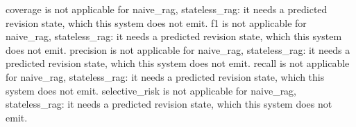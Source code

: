 \begin{table}
\footnotesize{coverage is not applicable for naive\_rag, stateless\_rag: it needs a predicted revision state, which this system does not emit.}
\footnotesize{f1 is not applicable for naive\_rag, stateless\_rag: it needs a predicted revision state, which this system does not emit.}
\footnotesize{precision is not applicable for naive\_rag, stateless\_rag: it needs a predicted revision state, which this system does not emit.}
\footnotesize{recall is not applicable for naive\_rag, stateless\_rag: it needs a predicted revision state, which this system does not emit.}
\footnotesize{selective\_risk is not applicable for naive\_rag, stateless\_rag: it needs a predicted revision state, which this system does not emit.}
\end{table}
